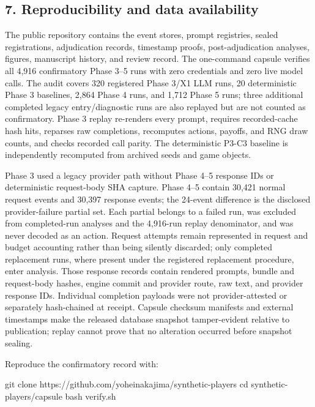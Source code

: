 \documentclass[
  11pt]{article}
\newenvironment{Shaded}{}{}
\newcommand{\BuiltInTok}[1]{\textcolor[rgb]{0.00,0.50,0.00}{#1}}
\newcommand{\FunctionTok}[1]{\textcolor[rgb]{0.02,0.16,0.49}{#1}}
\newcommand{\NormalTok}[1]{#1}
\begin{document}
\subsection{7. Reproducibility and data
availability}\label{reproducibility-and-data-availability}

The public repository contains the event stores, prompt registries,
sealed registrations, adjudication records, timestamp proofs,
post-adjudication analyses, figures, manuscript history, and review
record. The one-command capsule verifies all 4,916 confirmatory Phase
3--5 runs with zero credentials and zero live model calls. The audit
covers 320 registered Phase 3/X1 LLM runs, 20 deterministic Phase 3
baselines, 2,864 Phase 4 runs, and 1,712 Phase 5 runs; three additional
completed legacy entry/diagnostic runs are also replayed but are not
counted as confirmatory. Phase 3 replay re-renders every prompt,
requires recorded-cache hash hits, reparses raw completions, recomputes
actions, payoffs, and RNG draw counts, and checks recorded call parity.
The deterministic P3-C3 baseline is independently recomputed from
archived seeds and game objects.

Phase 3 used a legacy provider path without Phase 4--5 response IDs or
deterministic request-body SHA capture. Phase 4--5 contain 30,421 normal
request events and 30,397 response events; the 24-event difference is
the disclosed provider-failure partial set. Each partial belongs to a
failed run, was excluded from completed-run analyses and the 4,916-run
replay denominator, and was never decoded as an action. Request attempts
remain represented in request and budget accounting rather than being
silently discarded; only completed replacement runs, where present under
the registered replacement procedure, enter analysis. Those response
records contain rendered prompts, bundle and request-body hashes, engine
commit and provider route, raw text, and provider response IDs.
Individual completion payloads were not provider-attested or separately
hash-chained at receipt. Capsule checksum manifests and external
timestamps make the released database snapshot tamper-evident relative
to publication; replay cannot prove that no alteration occurred before
snapshot sealing.

Reproduce the confirmatory record with:

\begin{Shaded}
\begin{Highlighting}[]
\FunctionTok{git}\NormalTok{ clone https://github.com/yoheinakajima/synthetic{-}players}
\BuiltInTok{cd}\NormalTok{ synthetic{-}players/capsule}
\FunctionTok{bash}\NormalTok{ verify.sh}
\end{Highlighting}
\end{Shaded}
\end{document}
